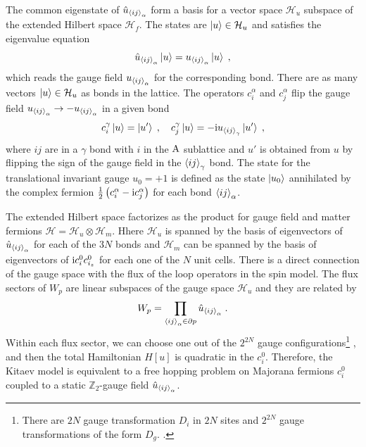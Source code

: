 The common eigenstate of $\hat{u}_{\braket{ij}_{\alpha} }$ form a basis for a vector space  $\mathcal{H}_u$ subspace of the extended Hilbert space $\mathcal{H}_f$.
The states are $\ket{u} \in \mathcal{H}_u$ and satisfies the eigenvalue equation
\begin{equation}
    \hat{u}_{\braket{ij}_{\alpha} }\ket{u}={u}_{\braket{ij}_{\alpha} }\ket{u} \; ,
\end{equation}
which reads the gauge field ${u}_{\braket{ij}_{\alpha}}$  for the corresponding bond. There are as many vectors $\ket{u} \in \mathcal{H}_u$ as bonds in the lattice. The operators $c_i^\alpha$ and $c_j^\alpha$ flip the gauge field ${u}_{\braket{ij}_{\alpha}} \to -{u}_{\braket{ij}_{\alpha}}  $ in a given bond%
\begin{equation}
     c^\gamma_i \ket{u} =  \ket{u'} \; , \quad
    c^\gamma_j \ket{u} = - \mathrm{i} u_{\braket{ij}_\gamma}  \ket{u'} \; ,
\end{equation}
where $ij$ are in a $\gamma$ bond with $i$ in the $\mathrm{A}$ sublattice and $u'$ is obtained from $u$ by flipping the sign of the gauge field in the $\braket{ij}_\gamma$ bond.
The state for the translational invariant gauge $u_0=+1$ is defined as the state $\ket{u_0}$ annihilated by  the complex fermion $\frac{1}{2}\left( c_i^\alpha - \mathrm{i} c_j^\alpha \right)$ for each bond $\braket{ij}_\alpha$.

The extended Hilbert space factorizes as the product for gauge field and matter fermions $\mathcal{H}=\mathcal{H}_u \otimes \mathcal{H}_{m}$.  Hhere $\mathcal{H}_u$ is spanned by the basis of eigenvectors of $\hat{u}_{\braket{ij}_\alpha}$ for each of the $3N$ bonds and  $\mathcal{H}_m$ can  be %
spanned by the basis of eigenvectors of $\mathrm{i} c_i^0 c_{i_z}^0 $ for each one of the $N$ unit cells.
There is a direct connection of the gauge space with the flux of the loop operators in the spin model.
The flux sectors of $W_p$ are linear subspaces of the gauge space $\mathcal{H}_u$ %
and they are related by
\begin{equation}
    W_p = \prod_{\braket{ij}_{\alpha} \in \partial p } \hat{u}_{\braket{ij}_{\alpha} } \; .
\end{equation}
Within each flux sector, we can choose %
one out of the $2^{2N}$ gauge configurations\footnote{There are $2N$ gauge transformation $D_i$ in $2N$ sites and $2^{2N}$ gauge transformations of the form $D_g$. %
.}
, and then the total Hamiltonian $H[u]$ is quadratic in the $c_i^0$. %
Therefore, the Kitaev model is equivalent to a free hopping problem on Majorana fermions $c_i^0$ coupled to a static $\mathbb{Z}_2$-gauge field $\hat{u}_{\braket{ij}_{\alpha} }$.



